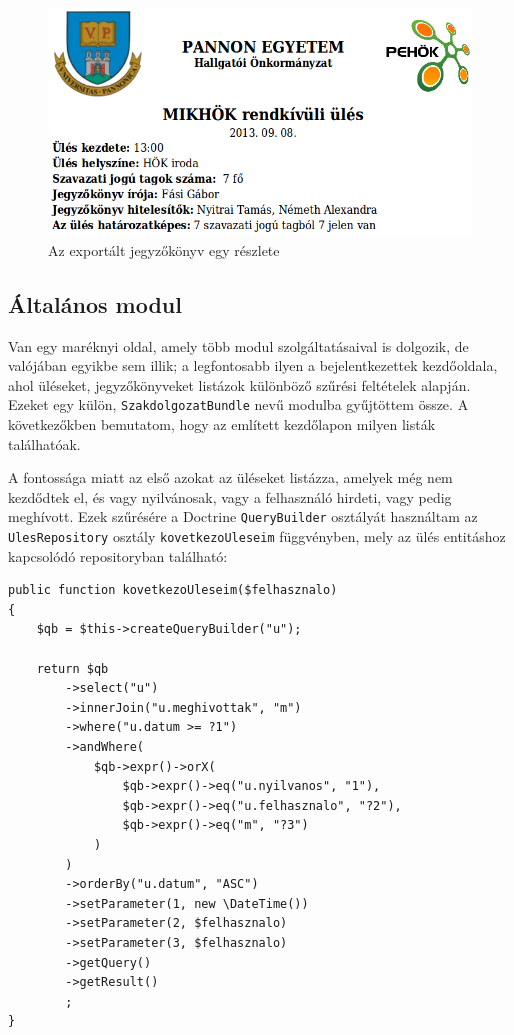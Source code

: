 \documentclass[a4paper,12pt,oneside]{report}
\begin{document}
\begin{figure}[h]
    \centering
    \includegraphics[width=\textwidth]{jegyzokonyv_export.png}
    \caption{Az exportált jegyzőkönyv egy részlete}
    \label{fig:jegyzokonyv_export}
\end{figure}

\subsection{Általános modul}

Van egy maréknyi oldal, amely több modul szolgáltatásaival is dolgozik, de valójában egyikbe sem illik; a legfontosabb ilyen a bejelentkezettek kezdőoldala, ahol üléseket, jegyzőkönyveket listázok különböző szűrési feltételek alapján. Ezeket egy külön, {\tt SzakdolgozatBundle} nevű modulba gyűjtöttem össze. A következőkben bemutatom, hogy az említett kezdőlapon milyen listák találhatóak.

A fontossága miatt az első azokat az üléseket listázza, amelyek még nem kezdődtek el, és vagy nyilvánosak, vagy a felhasználó hirdeti, vagy pedig meghívott. Ezek szűrésére a Doctrine {\tt QueryBuilder} osztályát használtam az {\tt UlesRepository} osztály {\tt kovetkezoUleseim} függvényben, mely az ülés entitáshoz kapcsolódó repositoryban található:

\begin{lstlisting}
public function kovetkezoUleseim($felhasznalo)
{
    $qb = $this->createQueryBuilder("u");

    return $qb
        ->select("u")
        ->innerJoin("u.meghivottak", "m")
        ->where("u.datum >= ?1")
        ->andWhere(
            $qb->expr()->orX(
                $qb->expr()->eq("u.nyilvanos", "1"),
                $qb->expr()->eq("u.felhasznalo", "?2"),
                $qb->expr()->eq("m", "?3")
            )
        )
        ->orderBy("u.datum", "ASC")
        ->setParameter(1, new \DateTime())
        ->setParameter(2, $felhasznalo)
        ->setParameter(3, $felhasznalo)
        ->getQuery()
        ->getResult()
        ;
}
\end{lstlisting}
\end{document}
